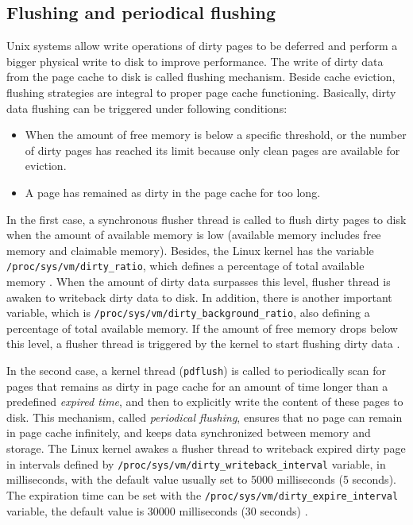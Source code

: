 \subsection{Flushing and periodical flushing}

Unix systems allow write operations of dirty pages to be deferred and perform 
a bigger physical write to disk to improve performance. The write of 
dirty data from the page cache to disk is called flushing mechanism. 
Beside cache eviction, flushing strategies are integral to proper 
page cache functioning.
Basically, dirty data flushing can be triggered under following conditions:

\begin{itemize}
    \item When the amount of free memory is below a specific threshold, or the 
    number of dirty pages has reached its limit because  only clean pages are 
    available for eviction. 
    \item A page has remained as dirty in the page cache for too long. 
\end{itemize}

In the first case, a synchronous flusher thread is called to flush dirty pages 
to disk when the amount of available memory is low (available memory 
includes free memory and claimable memory).
Besides, the Linux kernel has the variable \texttt{/proc/sys/vm/dirty\_ratio}, 
which defines a percentage of total available memory . 
When the amount of dirty data surpasses this level, flusher thread is awaken 
to writeback dirty data to disk.
In addition, there is another important variable, 
which is \texttt{/proc/sys/vm/dirty\_background\_ratio},
also defining a percentage of total available memory. 
If the amount of free memory drops below this level, a flusher thread is 
triggered by the kernel to start flushing dirty data \cite{linuxdev3rd2010}.

In the second case, a kernel thread (\texttt{pdflush}) is called to periodically 
scan for pages that remains as dirty in page cache for an amount of time 
longer than a predefined \textit{expired time}, and then to explicitly write 
the content of these pages to disk. 
This mechanism, called \textit{periodical flushing}, ensures that no page 
can remain in page cache infinitely, and keeps data synchronized between 
memory and storage.
The Linux kernel awakes a flusher thread to writeback expired dirty page in 
intervals defined by \texttt{/proc/sys/vm/dirty\_writeback\_interval} variable, 
in milliseconds, with the default value usually set to 5000 milliseconds (5 seconds). 
The expiration time can be set with the 
\texttt{/proc/sys/vm/dirty\_expire\_interval} variable, 
the default value is 30000 milliseconds (30 seconds) \cite{linuxdev3rd2010}.

